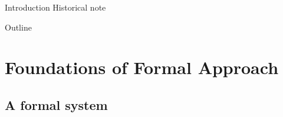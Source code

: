 \documentclass[aspectratio=169, 12pt, fleqn]{beamer}
\begin{document}
\begin{frame}{Introduction} {Historical note}
\begin{figure}
\end{figure}
\end{frame}

\begin{frame}{Outline}
  \tableofcontents
\end{frame}

\section{Foundations of Formal Approach}

\subsection{A formal system}
\end{document}
